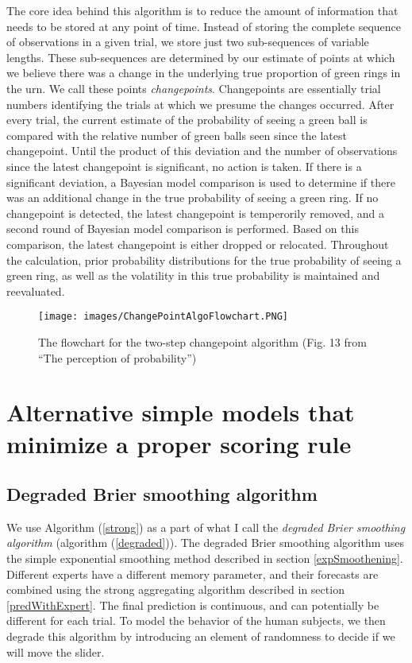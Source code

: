 \documentclass{article}
\begin{document}
The core idea behind this algorithm is to reduce the amount of information that needs to be stored at any point of time. Instead of storing the complete sequence of observations in a given trial, we store just two sub-sequences of variable lengths. These sub-sequences are determined by our estimate of points at which we believe there was a change in the underlying true proportion of green rings in the urn. We call these points \textit{changepoints}. Changepoints are essentially trial numbers identifying the trials at which we presume the changes occurred. After every trial, the current estimate of the probability of seeing a green ball is compared with the relative number of green balls seen since the latest changepoint. Until the product of this deviation and the number of observations since the latest changepoint is significant, no action is taken. If there is a significant deviation, a Bayesian model comparison is used to determine if there was an additional change in the true probability of seeing a green ring. If no changepoint is detected, the latest changepoint is temperorily removed, and a second round of Bayesian model comparison is performed. Based on this comparison, the latest changepoint is either dropped or relocated. Throughout the calculation, prior probability distributions for the true probability of seeing a green ring, as well as the volatility in this true probability is maintained and reevaluated.

\begin{figure}
	\texttt{[image: images/ChangePointAlgoFlowchart.PNG]}
	\caption{The flowchart for the two-step changepoint algorithm (Fig. 13 from ``The perception of probability'')}
	\label{fig:flowchart}
\end{figure}

\section{Alternative simple models that minimize a proper scoring rule}
\label{altNonBayesian}

\subsection{Degraded Brier smoothing algorithm}
We use Algorithm (\ref{strong}) as a part of what I call the \textit{degraded Brier smoothing algorithm} (algorithm (\ref{degraded})). The degraded Brier smoothing algorithm uses the simple exponential smoothing method described in section \ref{expSmoothening}. Different experts have a different memory parameter, and their forecasts are combined using the strong aggregating algorithm described in section \ref{predWithExpert}. The final prediction is continuous, and can potentially be different for each trial. To model the behavior of the human subjects, we then degrade this algorithm by introducing an element of randomness to decide if we will move the slider. 
\end{document}
